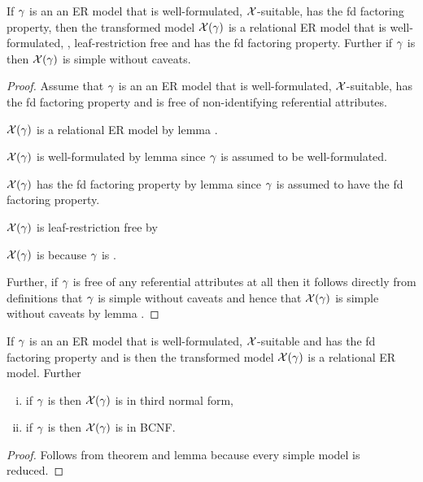 \begin{lemma}
If  $\gamma$ is an an ER model that is well-formulated,  $\mathcal{X}$-suitable, has the fd factoring property,
then the transformed model $\mathcal{X}(\gamma)$ is a  relational ER model that is well-formulated, , leaf-restriction free
and has the fd factoring property.   
Further if $\gamma$ is   then  $\mathcal{X}(\gamma)$ is simple without caveats.
\end{lemma}
\begin{proof}
Assume that $\gamma$ is an an ER model that is well-formulated,  $\mathcal{X}$-suitable, has the fd factoring property and
is free of non-identifying referential attributes. 

$\mathcal{X}(\gamma)$ is a  relational ER model by lemma .

$\mathcal{X}(\gamma)$ is well-formulated by lemma  since $\gamma$ is assumed to be well-formulated.

$\mathcal{X}(\gamma)$ has the fd factoring property by lemma   since $\gamma$ is assumed to have the fd factoring property.

$\mathcal{X}(\gamma)$ is leaf-restriction free by 

$\mathcal{X}(\gamma)$ is   because $\gamma$ is .

Further, if $\gamma$ is free of any referential attributes at all then it follows directly from definitions that $\gamma$ is simple without caveats
and hence  that $\mathcal{X}(\gamma)$ is simple without caveats by lemma .
\end{proof}

\begin{theorem}
If  $\gamma$ is an an ER model that is well-formulated,  $\mathcal{X}$-suitable and has the fd factoring property
and is 
then the transformed model $\mathcal{X}(\gamma)$ is a  relational ER model. Further
\begin{enumerate}[(i)]
\item  if $\gamma$ is   then  $\mathcal{X}(\gamma)$ is in third normal form, 
\item 
if $\gamma$ is  then  $\mathcal{X}(\gamma)$ is in BCNF.
\end{enumerate}
\end{theorem}
\begin{proof}
Follows from theorem  and lemma  because every simple model is reduced.
\end{proof}

